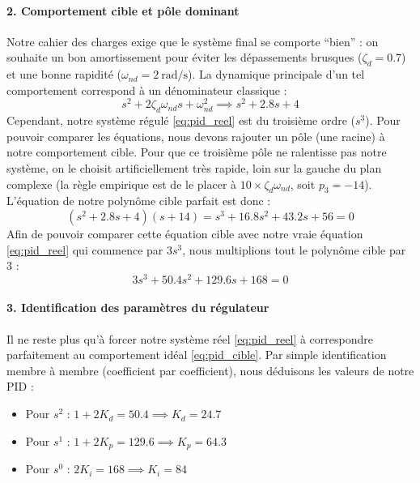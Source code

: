 \documentclass[11pt,a4paper]{article}
\begin{document}
\paragraph{2. Comportement cible et pôle dominant}
Notre cahier des charges exige que le système final se comporte \enquote{bien} : on souhaite un bon amortissement pour éviter les dépassements brusques ($\zeta_d = 0.7$) et une bonne rapidité ($\omega_{nd} = \qty{2}{\radian\per\second}$). La dynamique principale d'un tel comportement correspond à un dénominateur classique :
\begin{equation}
    s^2 + 2\zeta_d\omega_{nd}s + \omega_{nd}^2 \implies s^2 + 2.8s + 4
\end{equation}
Cependant, notre système régulé \cref{eq:pid_reel} est du troisième ordre ($s^3$). Pour pouvoir comparer les équations, nous devons rajouter un pôle (une racine) à notre comportement cible. Pour que ce troisième pôle ne ralentisse pas notre système, on le choisit artificiellement très rapide, loin sur la gauche du plan complexe (la règle empirique est de le placer à $10 \times \zeta_d \omega_{nd}$, soit $p_3 = -14$). L'équation de notre polynôme cible parfait est donc :
\begin{equation}
    (s^2 + 2.8s + 4)(s + 14) = s^3 + 16.8s^2 + 43.2s + 56 = 0
\end{equation}
Afin de pouvoir comparer cette équation cible avec notre vraie équation \cref{eq:pid_reel} qui commence par $3s^3$, nous multiplions tout le polynôme cible par 3 :
\begin{equation}
    3s^3 + 50.4s^2 + 129.6s + 168 = 0
    \label{eq:pid_cible}
\end{equation}

\paragraph{3. Identification des paramètres du régulateur}
Il ne reste plus qu'à forcer notre système réel \cref{eq:pid_reel} à correspondre parfaitement au comportement idéal \cref{eq:pid_cible}. Par simple identification membre à membre (coefficient par coefficient), nous déduisons les valeurs de notre PID :
\begin{itemize}
    \item Pour $s^2$ : $1 + 2K_d = 50.4 \implies K_d = 24.7$
    \item Pour $s^1$ : $1 + 2K_p = 129.6 \implies K_p = 64.3$
    \item Pour $s^0$ : $2K_i = 168 \implies K_i = 84$
\end{itemize}
\end{document}
